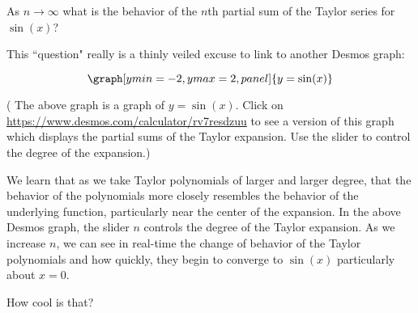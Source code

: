 \documentclass{ximera}
\begin{document}
\begin{question}
As $n\to \infty$ what is the behavior of the $n$th partial sum of the Taylor series for $\sin(x)$?

\begin{explanation}
This ``question" really is a thinly veiled excuse to link to another Desmos graph:

\begin{onlineOnly}
$$\graph[ymin=-2,ymax=2, panel]{y=\sin(x)}$$
\end{onlineOnly}
( The above graph is a graph of $y=\sin(x)$.  Click on \url{https://www.desmos.com/calculator/rv7resdzuu} to see a  version of this graph which displays the partial sums of the Taylor expansion.  Use the slider to control the degree of the expansion.)


We learn that as we take Taylor polynomials of larger and larger degree, that the behavior of the polynomials more closely resembles the behavior of the underlying function, particularly near the center of the expansion.  In the above Desmos graph, the slider $n$ controls the degree of the Taylor expansion.  As we increase $n$, we can see in real-time the change of behavior of the Taylor polynomials and how quickly, they begin to converge to $\sin(x)$ particularly about $x=0$.

How cool is that?


\begin{multipleChoice}
\end{multipleChoice}




\end{explanation}
\end{question}
\end{document}
